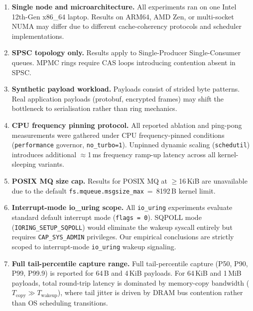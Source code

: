 \documentclass[10pt,conference]{IEEEtran}
\begin{document}
\begin{enumerate}
  \item \textbf{Single node and microarchitecture.}  All experiments ran on one
        Intel 12th-Gen x86\_64 laptop.  Results on ARM64, AMD Zen, or
        multi-socket NUMA may differ due to different cache-coherency
        protocols and scheduler implementations.

  \item \textbf{SPSC topology only.}  Results apply to Single-Producer
        Single-Consumer queues.  MPMC rings require CAS loops introducing
        contention absent in SPSC.

  \item \textbf{Synthetic payload workload.}  Payloads consist of strided byte
        patterns.  Real application payloads (protobuf, encrypted frames)
        may shift the bottleneck to serialisation rather than ring mechanics.

  \item \textbf{CPU frequency pinning protocol.}  All reported ablation and
        ping-pong measurements were gathered under CPU frequency-pinned
        conditions (\texttt{performance} governor, \texttt{no\_turbo=1}).
        Unpinned dynamic scaling (\texttt{schedutil}) introduces additional
        $\approx$1\,ms frequency ramp-up latency across all kernel-sleeping variants.

  \item \textbf{POSIX MQ size cap.}  Results for POSIX MQ at $\geq$16\,KiB
        are unavailable due to the default
        \texttt{fs.mqueue.msgsize\_max}~=~8192\,B kernel limit.

  \item \textbf{Interrupt-mode io\_uring scope.}  All \texttt{io\_uring}
        experiments evaluate standard default interrupt mode (\texttt{flags~=~0}).  SQPOLL
        mode (\texttt{IORING\_SETUP\_SQPOLL}) would eliminate the wakeup syscall entirely but requires
        \texttt{CAP\_SYS\_ADMIN} privileges. Our empirical conclusions are strictly scoped to interrupt-mode
        \texttt{io\_uring} wakeup signaling.

  \item \textbf{Full tail-percentile capture range.} Full tail-percentile
        capture (P50, P90, P99, P99.9) is reported for 64\,B and 4\,KiB
        payloads. For 64\,KiB and 1\,MiB payloads, total round-trip latency is
        dominated by memory-copy bandwidth ($T_{\text{copy}} \gg T_{\text{wakeup}}$),
        where tail jitter is driven by DRAM bus contention rather than OS scheduling transitions.
\end{enumerate}
\end{document}
